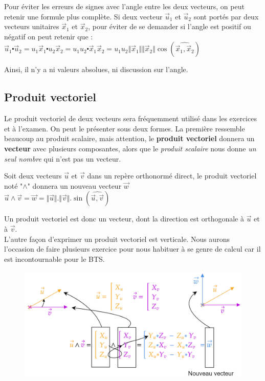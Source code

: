 \documentclass[
	11pt, %
	fleqn, %
	a4paper, %
]{LegrandOrangeBook}
\begin{document}
Pour éviter les erreurs de signes avec l'angle entre les deux vecteurs, on peut retenir une formule plus complète.
Si deux vecteur $\Vec{u}_1$ et $\Vec{u}_2$ sont portés par deux vecteurs unitaires $\Vec{x}_1$ et $\Vec{x}_2$, pour éviter de se demander si l'angle est positif ou négatif on peut retenir que : \\
$\Vec{u}_1 \centerdot \Vec{u}_2 = u_1 \Vec{x}_1 \centerdot u_2 \Vec{x}_2 =  u_1 u_2 \centerdot \Vec{x}_1 \Vec{x}_2 = u_1 u_2 \Vert \Vec{x}_1 \Vert \Vert \Vec{x}_2 \Vert \cos ( \widehat{\Vec{x}_1, \Vec{x}_2} ) $

Ainsi, il n’y a ni valeurs absolues, ni discussion sur l’angle.




\subsection{Produit vectoriel}
Le produit vectoriel de deux vecteurs sera fréquemment utilisé dans les exercices et à l'examen. On peut le présenter sous deux formes. La première ressemble beaucoup au produit scalaire, mais attention, le \textbf{produit vectoriel} donnera un \textbf{vecteur} avec plusieurs composantes, alors que le \textit{produit scalaire} nous donne \textit{un seul nombre} qui n'est pas un vecteur.

\begin{definition}
    Soit deux vecteurs $\vec{u}$ et $\Vec{v}$ dans un repère orthonormé direct, le produit vectoriel noté "$\land$" donnera un nouveau vecteur $\vec{w}$ \\
    $\vec{u} \land \vec{v} = \vec{w} = \Vert \vec{u} \Vert . \Vert \vec{v} \Vert . \sin ( \widehat{\Vec{u}, \Vec{v}} )$
\end{definition}

Un produit vectoriel est donc un vecteur, dont la direction est orthogonale à $\vec{u}$ et à $\Vec{v}$. \\

L'autre façon d'exprimer un produit vectoriel est verticale. Nous aurons l'occasion de faire plusieurs exercice pour nous habituer à se genre de calcul car il est incontournable pour le BTS.

\begin{figure}[H] %
	\centering %
	\includegraphics[width=1\textwidth]{Images/vecto1.png} %
\end{figure}
\end{document}
